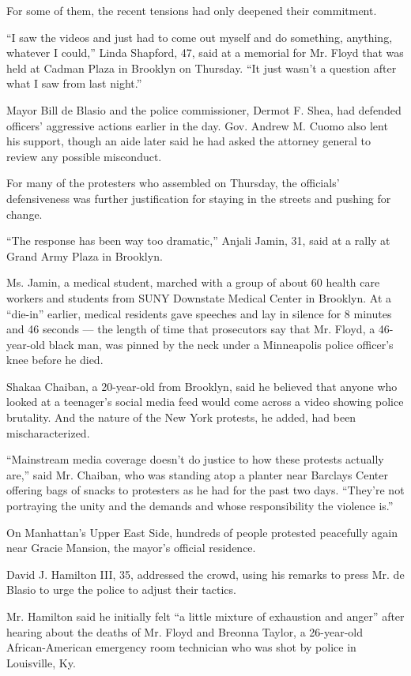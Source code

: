 For some of them, the recent tensions had only deepened their
commitment.

``I saw the videos and just had to come out myself and do something,
anything, whatever I could,'' Linda Shapford, 47, said at a memorial for
Mr. Floyd that was held at Cadman Plaza in Brooklyn on Thursday. ``It
just wasn't a question after what I saw from last night.''

Mayor Bill de Blasio and the police commissioner, Dermot F. Shea, had
defended officers' aggressive actions earlier in the day. Gov. Andrew M.
Cuomo also lent his support, though an aide later said he had asked the
attorney general to review any possible misconduct.

For many of the protesters who assembled on Thursday, the officials'
defensiveness was further justification for staying in the streets and
pushing for change.

``The response has been way too dramatic,'' Anjali Jamin, 31, said at a
rally at Grand Army Plaza in Brooklyn.

Ms. Jamin, a medical student, marched with a group of about 60 health
care workers and students from SUNY Downstate Medical Center in
Brooklyn. At a ``die-in'' earlier, medical residents gave speeches and
lay in silence for 8 minutes and 46 seconds --- the length of time that
prosecutors say that Mr. Floyd, a 46-year-old black man, was pinned by
the neck under a Minneapolis police officer's knee before he died.

Shakaa Chaiban, a 20-year-old from Brooklyn, said he believed that
anyone who looked at a teenager's social media feed would come across a
video showing police brutality. And the nature of the New York protests,
he added, had been mischaracterized.

``Mainstream media coverage doesn't do justice to how these protests
actually are,'' said Mr. Chaiban, who was standing atop a planter near
Barclays Center offering bags of snacks to protesters as he had for the
past two days. ``They're not portraying the unity and the demands and
whose responsibility the violence is.''

On Manhattan's Upper East Side, hundreds of people protested peacefully
again near Gracie Mansion, the mayor's official residence.

David J. Hamilton III, 35, addressed the crowd, using his remarks to
press Mr. de Blasio to urge the police to adjust their tactics.

Mr. Hamilton said he initially felt ``a little mixture of exhaustion and
anger'' after hearing about the deaths of Mr. Floyd and Breonna Taylor,
a 26-year-old African-American emergency room technician who was shot by
police in Louisville, Ky.

